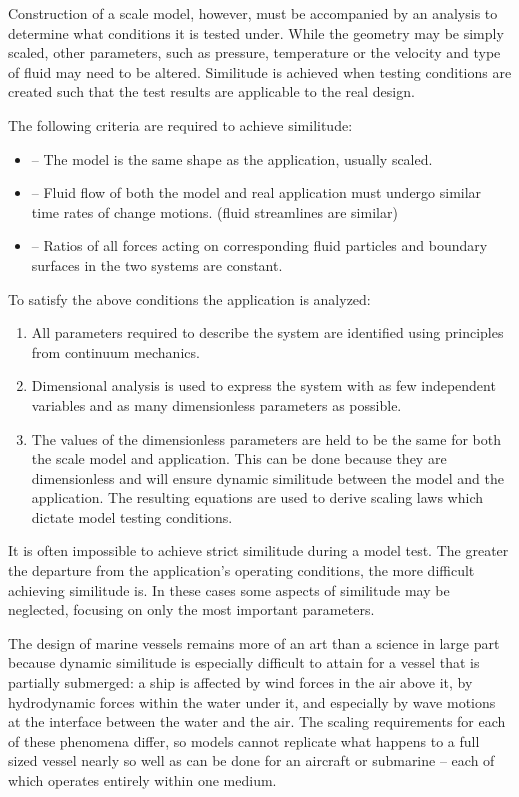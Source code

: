 Construction of a scale model, however, must be accompanied by an analysis to determine what conditions it is tested under. While the geometry may be simply scaled, other parameters, such as pressure, temperature or the velocity and type of fluid may need to be altered. Similitude is achieved when testing conditions are created such that the test results are applicable to the real design.

The following criteria are required to achieve similitude:
\begin{itemize}
\item {} -- The model is the same shape as the application, usually scaled.
%
\item {} -- Fluid flow of both the model and real application must undergo similar time rates of change motions. (fluid streamlines are similar)
%
\item {} -- Ratios of all forces acting on corresponding fluid particles and boundary surfaces in the two systems are constant.
\end{itemize}

To satisfy the above conditions the application is analyzed:
\begin{enumerate}
\item All parameters required to describe the system are identified using principles from continuum mechanics.
%
\item Dimensional analysis is used to express the system with as few independent variables and as many dimensionless parameters as possible.
%
\item The values of the dimensionless parameters are held to be the same for both the scale model and application. This can be done because they are dimensionless and will ensure dynamic similitude between the model and the application. The resulting equations are used to derive scaling laws which dictate model testing conditions.
\end{enumerate}

It is often impossible to achieve strict similitude during a model test. The greater the departure from the application's operating conditions, the more difficult achieving similitude is. In these cases some aspects of similitude may be neglected, focusing on only the most important parameters.

The design of marine vessels remains more of an art than a science in large part because dynamic similitude is especially difficult to attain for a vessel that is partially submerged: a ship is affected by wind forces in the air above it, by hydrodynamic forces within the water under it, and especially by wave motions at the interface between the water and the air. The scaling requirements for each of these phenomena differ, so models cannot replicate what happens to a full sized vessel nearly so well as can be done for an aircraft or submarine -- each of which operates entirely within one medium.

